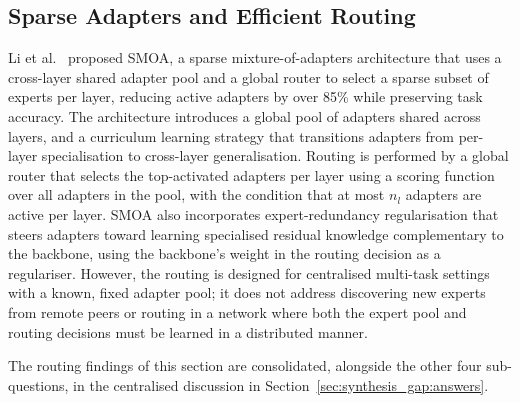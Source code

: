 \subsection{Sparse Adapters and Efficient Routing}
\label{sec:moe_routing:sparse}

Li et al.~\cite{LiZhouSparser2025} proposed SMOA, a sparse mixture-of-adapters architecture that
uses a cross-layer shared adapter pool and a global router to select a sparse subset of
experts per layer, reducing active adapters by over 85\% while preserving task accuracy.
The architecture introduces a global pool of adapters shared across layers, and a
curriculum learning strategy that transitions adapters from per-layer specialisation to
cross-layer generalisation. Routing is performed by a global router that selects the
top-activated adapters per layer using a scoring function over all adapters in the
pool, with the condition that at most $n_l$ adapters are active per layer. SMOA also
incorporates expert-redundancy regularisation that steers adapters toward learning
specialised residual knowledge complementary to the backbone, using the backbone's
weight in the routing decision as a regulariser. However, the routing is designed for
centralised multi-task settings with a known, fixed adapter pool; it does not address
discovering new experts from remote peers or routing in a network where both the expert
pool and routing decisions must be learned in a distributed manner.


\noindent The routing findings of this section are consolidated, alongside the
other four sub-questions, in the centralised discussion in
Section~\ref{sec:synthesis_gap:answers}.

